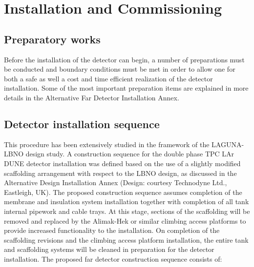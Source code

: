\section{Installation and Commissioning}
\label{sec:detectors-fd-alt-install}

\subsection{Preparatory works}

Before the installation of the detector can begin, a number of preparations must be conducted and boundary conditions must be met in order to allow one for both a safe as well a cost and time efficient realization of the detector installation. Some of the most important preparation items are explained in more details in the Alternative Far Detector Installation Annex.

\subsection{Detector installation sequence}

This procedure has been extensively studied in the framework of the LAGUNA-LBNO design study. A construction sequence for the double phase TPC LAr DUNE detector installation was defined based on the use of a slightly modified scaffolding arrangement with respect to the LBNO design, as discussed in the Alternative Design Installation Annex (Design: courtesy Technodyne Ltd., Eastleigh, UK). The proposed construction sequence assumes completion of the membrane and insulation system installation together with completion of all tank internal pipework and cable trays.  At this stage, sections of the scaffolding will be removed and replaced by the Alimak-Hek or similar climbing access platforms to provide increased functionality to the installation.  On completion of the scaffolding revisions and the climbing access platform installation, the entire tank and scaffolding systems will be cleaned in preparation for the detector installation. The proposed far detector construction sequence consists of:

